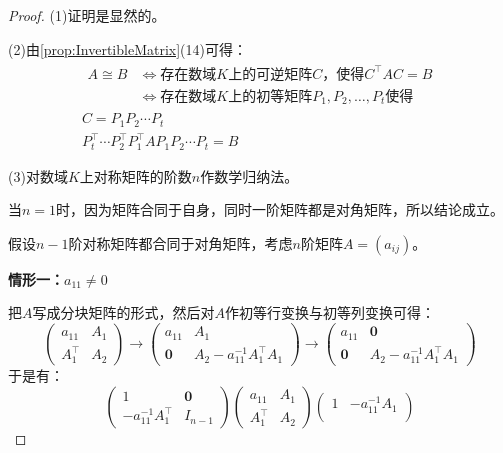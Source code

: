 \begin{proof}
	(1)证明是显然的。\par
	(2)由\cref{prop:InvertibleMatrix}(14)可得：
	\begin{gather*}
		\begin{aligned}
			A\cong B
			&\iff\text{存在数域$K$上的可逆矩阵$C$，使得}C^{\top}AC=B \\
			&\iff\text{存在数域$K$上的初等矩阵$P_1,P_2,\dots,P_t$使得}
		\end{aligned}\\
		C=P_1P_2\cdots P_t \\
		P_t^{\top}\cdots P_2^{\top}P_1^{\top}AP_1P_2\cdots P_t=B
	\end{gather*}\par
	(3)对数域$K$上对称矩阵的阶数$n$作数学归纳法。\par
	当$n=1$时，因为矩阵合同于自身，同时一阶矩阵都是对角矩阵，所以结论成立。\par
	假设$n-1$阶对称矩阵都合同于对角矩阵，考虑$n$阶矩阵$A=(a_{ij})$。\par
	\textbf{情形一：$a_{11}\ne 0$}\par
	把$A$写成分块矩阵的形式，然后对$A$作初等行变换与初等列变换可得：
	\begin{equation*}
		\begin{pmatrix}
			a_{11} & A_1 \\
			A_1^{\top} & A_2
		\end{pmatrix}
		\longrightarrow
		\begin{pmatrix}
			a_{11} & A_1 \\
			\mathbf{0} & A_2-a_{11}^{-1}A_1^{\top}A_1
		\end{pmatrix}
		\longrightarrow
		\begin{pmatrix}
			a_{11} & \mathbf{0} \\
			\mathbf{0} & A_2-a_{11}^{-1}A_1^{\top}A_1
		\end{pmatrix}
	\end{equation*}
	于是有：
	\begin{equation*}
		\begin{pmatrix}
			1 & \mathbf{0} \\
			-a_{11}^{-1}A_1^{\top} & I_{n-1}
		\end{pmatrix}
		\begin{pmatrix}
			a_{11} & A_1 \\
			A_1^{\top} & A_2
		\end{pmatrix}
		\begin{pmatrix}
			1 & -a_{11}^{-1}A_1 \\

\end{pmatrix}
\end{equation*}
\end{proof}
